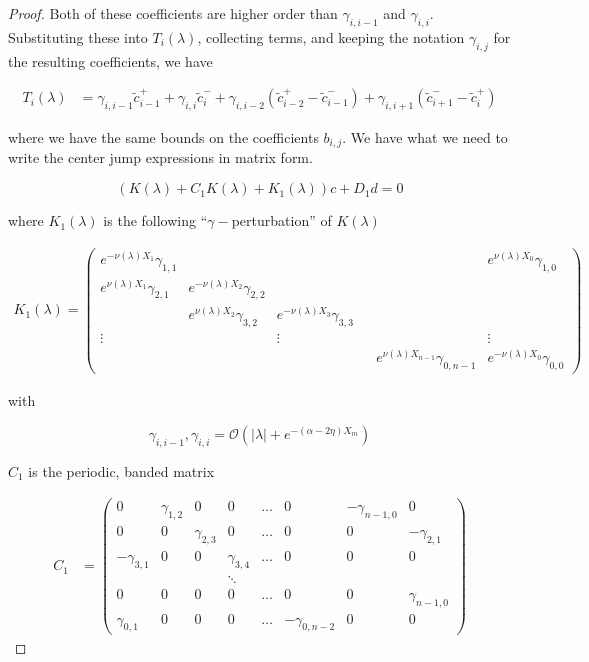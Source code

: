 \documentclass[thesis.tex]{subfiles}
\begin{document}
\begin{lemma}
\begin{proof}
Both of these coefficients are higher order than $\gamma_{i,i-1}$ and $\gamma_{i,i}$. Substituting these into $T_i(\lambda)$, collecting terms, and keeping the notation $\gamma_{i,j}$ for the resulting coefficients, we have

\begin{align*}
T_i(\lambda) &= \gamma_{i,i-1} \tilde{c}_{i-1}^+ + \gamma_{i,i} \tilde{c}_{i}^- + \gamma_{i,i-2} ( \tilde{c}_{i-2}^+ - \tilde{c}_{i-1}^-) + \gamma_{i,i+1} (\tilde{c}_{i+1}^- - \tilde{c}_i^+)
\end{align*}

where we have the same bounds on the coefficients $b_{i,j}$. We have what we need to write the center jump expressions in matrix form.

\[
(K(\lambda) + C_1 K(\lambda) + K_1(\lambda)) c + D_1 d = 0
\]

where $K_1(\lambda)$ is the following ``$\gamma-$perturbation'' of $K(\lambda)$ 

\begin{align*}
K_1(\lambda) =  
\begin{pmatrix}
e^{-\nu(\lambda)X_1} \gamma_{1,1} & & & & & e^{\nu(\lambda)X_0}\gamma_{1,0} \\
e^{\nu(\lambda)X_1}\gamma_{2,1} & e^{-\nu(\lambda)X_2}\gamma_{2,2} \\
& e^{\nu(\lambda)X_2}\gamma_{3,2} & e^{-\nu(\lambda)X_3}\gamma_{3,3} \\
\vdots & & \vdots & &&  \vdots \\
& & & & e^{\nu(\lambda)X_{n-1}}\gamma_{0,n-1} & e^{-\nu(\lambda)X_0}\gamma_{0,0} 
\end{pmatrix}
\end{align*}

with 

\[
\gamma_{i,i-1}, \gamma_{i,i} = \mathcal{O}(|\lambda| + e^{-(\alpha - 2 \eta) X_m})
\] 

$C_1$ is the periodic, banded matrix

\begin{align*}
C_1 &= \begin{pmatrix}
0 & \gamma_{1,2} & 0 & 0 & \dots & 0 & -\gamma_{n-1,0} & 0 \\
0 & 0 & \gamma_{2,3} & 0 & \dots & 0 & 0 & -\gamma_{2,1} \\
-\gamma_{3,1} & 0 & 0 & \gamma_{3,4} & \dots & 0 & 0 & 0 \\
&  & & \ddots  \\
0 & 0 & 0 & 0 & \dots & 0 & 0 & \gamma_{n-1,0} \\
\gamma_{0,1} & 0 & 0 & 0 & \dots & -\gamma_{0, n-2} & 0 & 0 
\end{pmatrix}
\end{align*}


\end{proof}
\end{lemma}
\end{document}
